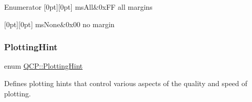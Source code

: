 \begin{DoxyEnumFields}{Enumerator}
[0pt][0pt]{}\mbox{\label{namespaceQCP_a7e487e3e2ccb62ab7771065bab7cae54a43d7361cb0c5244eabdc962021bffebc}} 
ms\+All&{\ttfamily 0x\+FF} all margins \\
\hline

[0pt][0pt]{}\mbox{\label{namespaceQCP_a7e487e3e2ccb62ab7771065bab7cae54a80aa4149f16dabd538f8b2e3d42c42d5}} 
ms\+None&{\ttfamily 0x00} no margin \\
\hline

\end{DoxyEnumFields}
\mbox{\label{namespaceQCP_a5400e5fcb9528d92002ddb938c1f4ef4}} 
\subsubsection{\texorpdfstring{Plotting\+Hint}{PlottingHint}}
{\footnotesize\ttfamily enum \hyperlink{namespaceQCP_a5400e5fcb9528d92002ddb938c1f4ef4}{Q\+C\+P\+::\+Plotting\+Hint}}

Defines plotting hints that control various aspects of the quality and speed of plotting.

